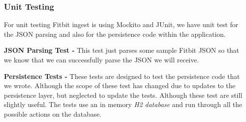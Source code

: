\subsubsection{Unit Testing}

\par
For unit testing Fitbit ingest is using Mockito and JUnit, we have unit test for the JSON parsing and also for the persistence code within the application.

\begin{itemized}
	\item \textbf{JSON Parsing Test -} This test just parses some sample Fitbit JSON so that we know that we can successfully parse the JSON we will receive.
	\item \textbf{Persistence Tests -} These tests are designed to test the persistence code that we wrote. Although the scope of these test has changed due to updates to the persistence layer, but neglected to update the tests. Although these test are still slightly useful. The tests use an in memory \textit{H2 database}\cite{H2} and run through all the possible actions on the database.
\end{itemized}

